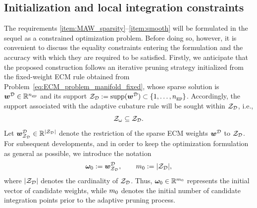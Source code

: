 \documentclass[11pt,a4paper]{article}
\begin{document}
%
%


\subsection{Initialization and local integration constraints}
\label{sec:MAW_local_constraints}

The requirements \ref{item:MAW_sparsity}--\ref{item:smooth} will be formulated
in the sequel as a constrained optimization problem. Before doing so, however,
it is convenient to discuss the equality constraints entering the formulation
and the accuracy with which they are required to be satisfied. Firstly, we anticipate that the proposed construction follows an iterative
pruning strategy initialized from the fixed-weight ECM rule obtained from
Problem~\eqref{eq:ECM_problem_manifold_fixed}, whose sparse solution is \(\bm{w}^{\mathcal{D}}\in\mathbb{R}^{n_{\mathrm{gp}}}\) and its support $  \mathcal{Z}_{\mathcal{D}}:=\operatorname{supp}(\bm{w}^{\mathcal{D}})
    \subset\{1,\ldots,n_{\mathrm{gp}}\}$.    Accordingly, the support associated with the adaptive cubature rule will be
sought within $\mathcal{Z}_{\mathcal{D}}$, i.e.,
\[
    \mathcal{Z}_{\omega} \subseteq \mathcal{Z}_{\mathcal{D}} .
\]
Let $\bm{w}^{\mathcal{D}}_{\mathcal{Z}_{\mathcal{D}}}\in\mathbb{R}^{|\mathcal{Z}_{\mathcal{D}}|}$ denote the restriction of the sparse ECM weights \(\bm{w}^{\mathcal{D}}\) to
\(\mathcal{Z}_{\mathcal{D}}\). For subsequent developments, and in order to keep the optimization
formulation as general as possible, we introduce the notation
\begin{equation}
\label{eq:initialW}
    \bm{\omega}_0 := \bm{w}^{\mathcal{D}}_{\mathcal{Z}_{\mathcal{D}}},
    \qquad
    m_0 := |\mathcal{Z}_{\mathcal{D}}|,
\end{equation}
where $|\mathcal{Z}_{\mathcal{D}}|$ denotes the cardinality of $\mathcal{Z}_{\mathcal{D}}$. Thus, \(\bm{\omega}_0\in\mathbb{R}^{m_0}\) represents the initial vector of
candidate weights, while \(m_0\) denotes the initial number of candidate
integration points prior to the adaptive pruning process.
\end{document}

